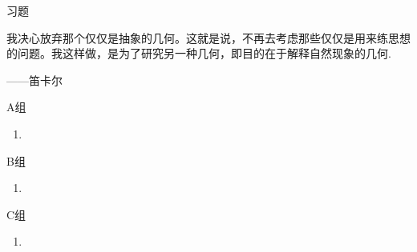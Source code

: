 \centerline{\heiti \Large 习题}
\vspace{2ex}
{\kaishu 我决心放弃那个仅仅是抽象的几何。这就是说，不再去考虑那些仅仅是用来练思想的问题。我这样做，是为了研究另一种几何，即目的在于解释自然现象的几何.}
\begin{flushright}
    \kaishu
    ——笛卡尔
\end{flushright}
\centerline{\heiti A组}
\begin{enumerate}
    \item
\end{enumerate}
\centerline{\heiti B组}
\begin{enumerate}
    \item
\end{enumerate}
\centerline{\heiti C组}
\begin{enumerate}
    \item
\end{enumerate}

